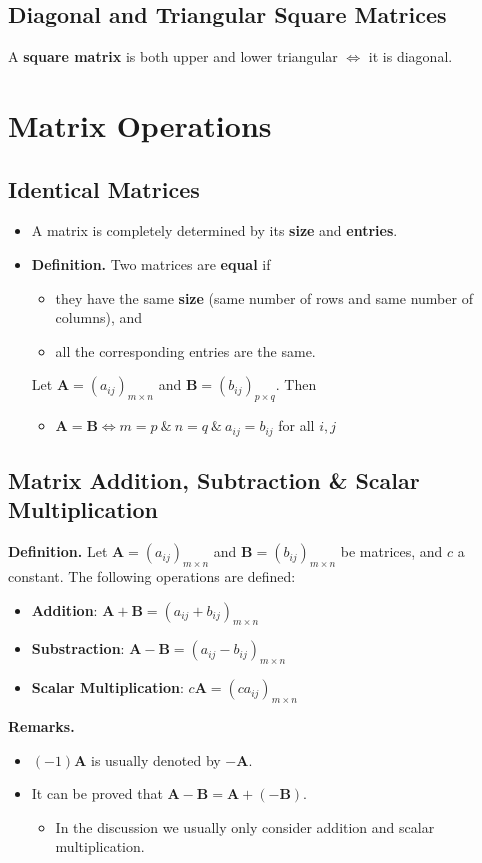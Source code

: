 \documentclass[../ma2001_notes.tex]{subfiles}
\begin{document}
\subsection{Diagonal and Triangular Square Matrices}
A \textbf{square matrix} is both upper and lower triangular \(\iff\) it is diagonal.

\section{Matrix Operations}
\subsection{Identical Matrices}
\begin{itemize}
	\item A matrix is completely determined by its \textbf{size} and \textbf{entries}.
	\item\textbf{Definition.} Two matrices are \textbf{equal} if
	\begin{itemize}
		\item they have the same \textbf{size} (same number of rows and same number of columns), and
		\item all the corresponding entries are the same.
	\end{itemize}
	Let \(\bm{A}=(a_{ij})_{m\times n}\) and \(\bm{B}=(b_{ij})_{p\times q}\). Then
	\begin{itemize}
		\item\(\bm{A}=\bm{B}\iff m=p\ \&\ n=q\ \&\ a_{ij}=b_{ij}\) for all \(i,j\)
	\end{itemize}
\end{itemize}

\subsection{Matrix Addition, Subtraction \& Scalar Multiplication}
\textbf{Definition.} Let \(\bm{A}=(a_{ij})_{m\times n}\) and \(\bm{B}=(b_{ij})_{m\times n}\) be matrices, and \(c\) a constant. The following operations are defined:
\begin{itemize}
	\item\textbf{Addition}: \(\bm{A}+\bm{B}=(a_{ij}+b_{ij})_{m\times n}\)
	\item\textbf{Substraction}: \(\bm{A}-\bm{B}=(a_{ij}-b_{ij})_{m\times n}\)
	\item\textbf{Scalar Multiplication}: \(c\bm{A}=(ca_{ij})_{m\times n}\)
\end{itemize}
\textbf{Remarks.}
\begin{itemize}
	\item\((-1)\bm{A}\) is usually denoted by \(-\bm{A}\).
	\item It can be proved that \(\bm{A}-\bm{B}=\bm{A}+(-\bm{B})\).
	\begin{itemize}
		\item In the discussion we usually only consider addition and scalar multiplication.
	\end{itemize}
\end{itemize}
\end{document}
